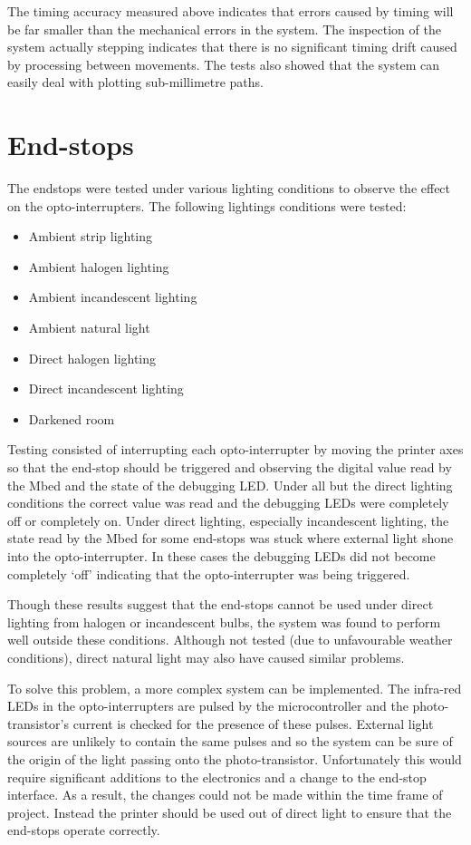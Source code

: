 			
			The timing accuracy measured above indicates that errors caused by timing
			will be far smaller than the mechanical errors in the system. The
			inspection of the system actually stepping indicates that there is no
			significant timing drift caused by processing between movements. The tests
			also showed that the system can easily deal with plotting sub-millimetre
			paths.
	
	\section{End-stops}
		
		The endstops were tested under various lighting conditions to observe the
		effect on the opto-interrupters. The following lightings conditions were
		tested:
		\begin{itemize}
			\item Ambient strip lighting
			\item Ambient halogen lighting
			\item Ambient incandescent lighting
			\item Ambient natural light
			\item Direct halogen lighting
			\item Direct incandescent lighting
			\item Darkened room
		\end{itemize}
		
		Testing consisted of interrupting each opto-interrupter by moving the
		printer axes so that the end-stop should be triggered and observing the
		digital value read by the Mbed and the state of the debugging LED. Under all
		but the direct lighting conditions the correct value was read and the
		debugging LEDs were completely off or completely on. Under direct lighting,
		especially incandescent lighting, the state read by the Mbed for some
		end-stops was stuck where external light shone into the opto-interrupter. In
		these cases the debugging LEDs did not become completely `off' indicating
		that the opto-interrupter was being triggered.
		
		Though these results suggest that the end-stops cannot be used under direct
		lighting from halogen or incandescent bulbs, the system was found to perform
		well outside these conditions. Although not tested (due to unfavourable
		weather conditions), direct natural light may also have caused similar
		problems.
		
		To solve this problem, a more complex system can be implemented. The
		infra-red LEDs in the opto-interrupters are pulsed by the microcontroller
		and the photo-transistor's current is checked for the presence of these
		pulses. External light sources are unlikely to contain the same pulses and
		so the system can be sure of the origin of the light passing onto the
		photo-transistor. Unfortunately this would require significant additions to
		the electronics and a change to the end-stop interface. As a result, the
		changes could not be made within the time frame of project. Instead the
		printer should be used out of direct light to ensure that the end-stops
		operate correctly.
	
